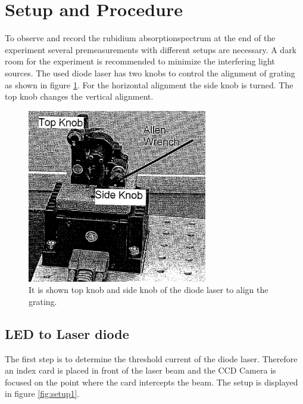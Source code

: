 \section{Setup and Procedure}
\label{sec:setup}
To observe and record the rubidium absorptionspectrum at the end
of the experiment
several premeasurements with different setups are necessary.
A dark room for the experiment is recommended to minimize the
interfering light sources.
The used diode laser has two knobs to control the alignment of grating
as shown in figure \ref{fig:knobs}.
For the horizontal alignment the side knob is turned. The
top knob changes the vertical alignment.
\begin{figure}
  \centering
  \includegraphics[width=0.7\textwidth]{Laserknobs.png}
  \caption{It is shown top knob and side knob of the diode laser to align the grating.\cite{V61}}
  \label{fig:knobs}
\end{figure}


\subsection{LED to Laser diode}
\label{subsec:LED_Laser}

The first step is to determine the threshold current
of the diode laser.
Therefore an index card is placed in front of the laser beam and the CCD Camera
is focused on the point where the card intercepts the beam.
The setup is displayed
in figure \ref{fig:setup1}.


